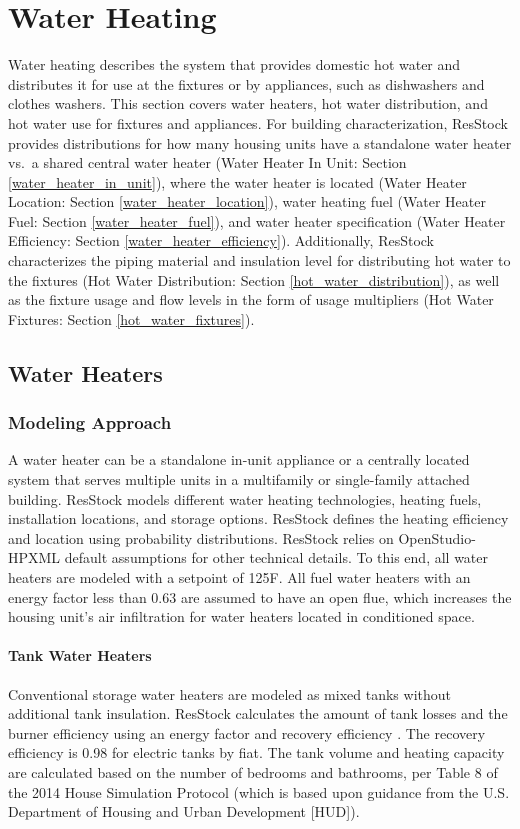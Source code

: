 \section{Water Heating}
Water heating describes the system that provides domestic hot water and distributes it for use at the fixtures or by appliances, such as dishwashers and clothes washers. This section covers water heaters, hot water distribution, and hot water use for fixtures and appliances. For building characterization, ResStock provides distributions for how many housing units have a standalone water heater vs.~a shared central water heater (Water Heater In Unit: Section \ref{water_heater_in_unit}), where the water heater is located (Water Heater Location: Section \ref{water_heater_location}), water heating fuel (Water Heater Fuel: Section \ref{water_heater_fuel}), and water heater specification (Water Heater Efficiency: Section \ref{water_heater_efficiency}). Additionally, ResStock characterizes the piping material and insulation level for distributing hot water to the fixtures (Hot Water Distribution: Section \ref{hot_water_distribution}), as well as the fixture usage and flow levels in the form of usage multipliers (Hot Water Fixtures: Section \ref{hot_water_fixtures}).

\subsection{Water Heaters}
\subsubsection{Modeling Approach}
A water heater can be a standalone in-unit appliance or a centrally located system that serves multiple units in a multifamily or single-family attached building. ResStock models different water heating technologies, heating fuels, installation locations, and storage options. ResStock defines the heating efficiency and location using probability distributions. ResStock relies on OpenStudio-HPXML default assumptions for other technical details. To this end, all water heaters are modeled with a setpoint of 125\degree F. All fuel water heaters with an energy factor less than 0.63 are assumed to have an open flue, which increases the housing unit’s air infiltration for water heaters located in conditioned space.

\paragraph{Tank Water Heaters}
Conventional storage water heaters are modeled as mixed tanks without additional tank insulation. ResStock calculates the amount of tank losses and the burner efficiency using an energy factor and recovery efficiency \citep{tank_model_parameters}. The recovery efficiency is 0.98 for electric tanks by fiat. The tank volume and heating capacity are calculated based on the number of bedrooms and bathrooms, per Table 8 of the 2014 House Simulation Protocol (which is based upon guidance from the U.S. Department of Housing and Urban Development [HUD]).

